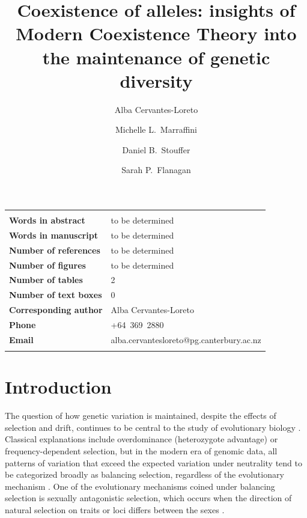\documentclass[12pt]{article}
\title{Coexistence of alleles: insights of Modern Coexistence Theory into the maintenance of genetic diversity}
\author[1]{Alba Cervantes-Loreto}
\author[1]{Michelle L.\ Marraffini}
\author[1]{Daniel B.\ Stouffer}
\author[1]{Sarah P.\ Flanagan}
\affil[1]{Centre for Integrative Ecology, School of Biological Sciences\\ University of Canterbury, Christchurch 8140, New Zealand}
\date{}
\newenvironment{ecolettcover}{\maketitle}{\clearpage}
\begin{document}
\linenumbers
\baselineskip30pt
\maketitle

\begin{ecolettcover}

\begin{center}
\begin{tabular}{ll}
\hline \\

\bf{Words in abstract}         & to be determined \\
\bf{Words in manuscript}       & to be determined\\
\bf{Number of references}      & to be determined  \\
\bf{Number of figures}			& to be determined \\
\bf{Number of tables} 			& 2 \\
\bf{Number of text boxes}		& 0 \\
\bf{Corresponding author}      & Alba Cervantes-Loreto \\
\bf{Phone}                     & +64~369~2880 \\

\bf{Email}                     & alba.cervantesloreto@pg.canterbury.ac.nz \\
                                                                        \\
\hline
\end{tabular}
\end{center}

\maketitle

\end{ecolettcover}
\section{Introduction}
The question of how genetic variation is maintained, despite the effects of selection and drift, continues to be central to the study of evolutionary biology \citep{walsh_evolution_2018}. Classical explanations include overdominance (heterozygote advantage) or frequency-dependent selection, but in the modern era of genomic data, all patterns of variation that exceed the expected variation under neutrality tend to be categorized broadly as balancing selection, regardless of the evolutionary mechanism \citep{mitchell-olds_which_2007}.  One of the evolutionary mechanisms coined under balancing selection is sexually antagonistic selection, which occurs when the direction of natural selection on traits or loci differs between the sexes \citep{arnqvist2013sexual}.
\end{document}
